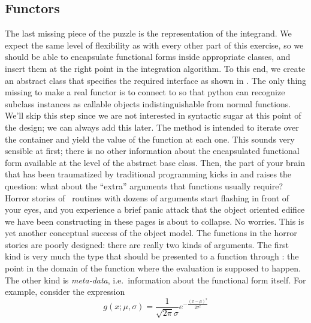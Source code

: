 \subsection{Functors}
\label{sec:classes:functors}

The last missing piece of the puzzle is the representation of the integrand. We expect the same
level of flexibility as with every other part of this exercise, so we should be able to
encapsulate functional forms inside appropriate classes, and insert them at the right point in
the integration algorithm. To this end, we create an abstract class  that
specifies the required interface as shown in . The only thing
missing to make  a real functor\supercite{c++-idioms} is to connect  to
 so that python can recognize subclass instances as callable objects
indistinguishable from normal functions. We'll skip this step since we are not interested in
syntactic sugar at this point of the design; we can always add this later.
%
%
The method  is intended to iterate over the container  and
yield the value of the function at each one. This sounds very sensible at first; there is no
other information about the encapsulated functional form available at the level of the
abstract base class. Then, the part of your brain that has been traumatized by traditional
programming kicks in and raises the question: what about the ``extra'' arguments that functions
usually require? Horror stories of \fortran\ routines with dozens of arguments start flashing
in front of your eyes, and you experience a brief panic attack that the object oriented
edifice we have been constructing in these pages is about to collapse. No worries. This is yet
another conceptual success of the object model. The functions in the horror stories are poorly
designed: there are really two kinds of arguments. The first kind is very much the type that
should be presented to a function through : the point in the domain of the
function where the evaluation is supposed to happen. The other kind is {\em meta-data},
i.e.~information about the functional form itself. For example, consider the expression
%
\begin{equation}
  g(x; \mu,\sigma) = \frac{1}{\sqrt{2\pi} \sigma} e^{-\frac{(x-\mu)^2}{2\sigma^2}}
\label{eq:gaussian}
\end{equation}
